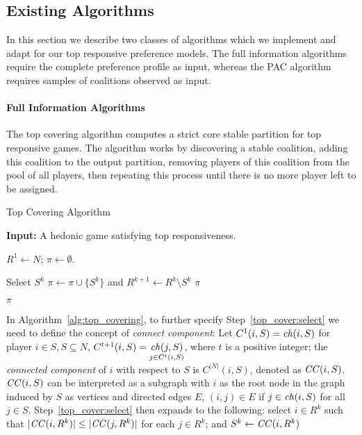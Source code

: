 \subsection{Existing Algorithms}
\label{subsec:algorithms}
In this section we describe two classes of algorithms which we implement and adapt
for our top responsive preference models.
The full information algorithms require the complete preference profile as
input, whereas the PAC algorithm requires samples of coalitions observed as input.

\paragraph{Full Information Algorithms}
\label{para:full_pref_algos}
The top covering algorithm\cite{ALCALDE2004869, Dimitrov2006TopRA} computes a
strict core stable partition for top responsive games.
The algorithm works by discovering a stable coalition, adding this coalition
to the output partition, removing players of this coalition from the pool
of all players, then repeating this process until there is no more player left
to be assigned.

\begin{algorithm}[htb]
  \caption{Top Covering Algorithm}
  \label{alg:top_covering}
  \textbf{Input:} A hedonic game satisfying top responsiveness.

  \begin{algorithmic}[1]
  \State $R^1 \leftarrow N$; $\pi \leftarrow \emptyset$.

    \State \label{top_cover:select} Select $S^k$
    \State \label{top_cover:remove} $\pi \leftarrow \pi \cup \lbrace S^k \rbrace$ and $R^{k+1} \leftarrow  R^k \setminus S^k$
      \State \Return $\pi$
    \EndIf
  \EndFor

  \State \Return $\pi$
 \end{algorithmic}
\end{algorithm}

In Algorithm~\ref{alg:top_covering}, to further specify Step~\ref{top_cover:select}
we need to define the concept of \textit{connect component}:
Let $C^1(i, S) = \mathit{ch}(i, S)$ for player $i \in S, S \subseteq N$,
$C^{t + 1}(i, S) = \underset{j \in C^t(i, S)}{\mathit{ch}(j, S)}$, where $t$ is a positive
integer; the \textit{connected component} of $i$ with respect to $S$ is
$C^{|N|}(i, S)$, denoted as $\mathit{CC}(i, S)$.
$\mathit{CC}(i, S)$ can be interpreted as a subgraph with $i$ as the root node in the graph
induced by $S$ as vertices and directed edges $E$,
$(i, j) \in E$ if $j \in \mathit{ch}(i, S)$ for all $j \in S$.
Step~\ref{top_cover:select} then expands to the following: select $i\in R^k$ such
that $|\mathit{CC}(i,R^k)| \leq |\mathit{CC}(j,R^k)|$ for each $j\in R^k$;
and $S^k\leftarrow \mathit{CC}(i,R^k)$

